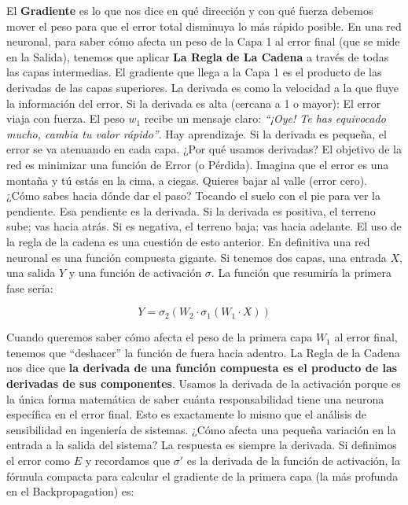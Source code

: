 \documentclass[a4paper,11pt]{article}
\renewenvironment{equation}{\begin{equation*}}{\end{equation*}}
\let\oldequation\equation
\let\endoldequation\endequation
\renewenvironment{equation}
  {\vspace{0.5em}\oldequation}
  {\endoldequation\vspace{0.5em}}
\begin{document}
El \textbf{Gradiente} es lo que nos dice en qué dirección y con qué
fuerza debemos mover el peso para que el error total disminuya lo más
rápido posible. En una red neuronal, para saber cómo afecta un peso de
la Capa 1 al error final (que se mide en la Salida), tenemos que aplicar
\textbf{La Regla de La Cadena} a través de todas las capas intermedias.
El gradiente que llega a la Capa 1 es el producto de las derivadas de
las capas superiores. La derivada es como la velocidad a la que fluye la
información del error. Si la derivada es alta (cercana a 1 o mayor): El
error viaja con fuerza. El peso \(w_1\) recibe un mensaje claro:
\emph{``¡Oye! Te has equivocado mucho, cambia tu valor rápido''}. Hay
aprendizaje. Si la derivada es pequeña, el error se va atenuando en cada
capa. ¿Por qué usamos derivadas? El objetivo de la red es minimizar una
función de Error (o Pérdida). Imagina que el error es una montaña y tú
estás en la cima, a ciegas. Quieres bajar al valle (error cero). ¿Cómo
sabes hacia dónde dar el paso? Tocando el suelo con el pie para ver la
pendiente. Esa pendiente es la derivada. Si la derivada es positiva, el
terreno sube; vas hacia atrás. Si es negativa, el terreno baja; vas
hacia adelante. El uso de la regla de la cadena es una cuestión de esto
anterior. En definitiva una red neuronal es una función compuesta
gigante. Si tenemos dos capas, una entrada \(X\), una salida \(Y\) y una
función de activación \(\sigma\). La función que resumiría la primera
fase sería:

\begin{equation}
Y = \sigma_2 \left(
W_2 \cdot \sigma_1 \left(
W_1 \cdot X
\right)
\right)
\end{equation}

Cuando queremos saber cómo afecta el peso de la primera capa \(W_1\) al
error final, tenemos que ``deshacer'' la función de fuera hacia adentro.
La Regla de la Cadena nos dice que \textbf{la derivada de una función
compuesta es el producto de las derivadas de sus componentes}. Usamos la
derivada de la activación porque es la única forma matemática de saber
cuánta responsabilidad tiene una neurona específica en el error final.
Esto es exactamente lo mismo que el análisis de sensibilidad en
ingeniería de sistemas. ¿Cómo afecta una pequeña variación en la entrada
a la salida del sistema? La respuesta es siempre la derivada. Si
definimos el error como \(E\) y recordamos que \(\sigma'\) es la
derivada de la función de activación, la fórmula compacta para calcular
el gradiente de la primera capa (la más profunda en el Backpropagation)
es:
\end{document}
